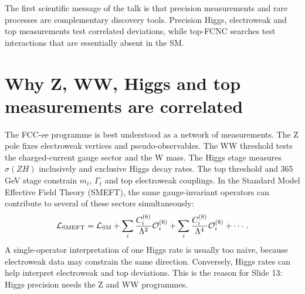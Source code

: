 \documentclass[11pt,a4paper]{report}
\begin{document}
\begin{keymessagebox}
The first scientific message of the talk is that precision measurements and rare processes are complementary discovery tools.  Precision Higgs, electroweak and top measurements test correlated deviations, while top-FCNC searches test interactions that are essentially absent in the SM.
\end{keymessagebox}

\section{Why Z, WW, Higgs and top measurements are correlated}
The FCC-ee programme is best understood as a network of measurements.  The Z pole fixes electroweak vertices and pseudo-observables.  The WW threshold tests the charged-current gauge sector and the W mass.  The Higgs stage measures $\sigma(ZH)$ inclusively and exclusive Higgs decay rates.  The top threshold and 365 GeV stage constrain $m_t$, $\Gamma_t$ and top electroweak couplings.  In the Standard Model Effective Field Theory (SMEFT), the same gauge-invariant operators can contribute to several of these sectors simultaneously:
\begin{equation}
  \mathcal L_{\rm SMEFT}=\mathcal L_{\rm SM}+
  \sum_i\frac{C_i^{(6)}}{\Lambda^2}\mathcal O_i^{(6)}+
  \sum_i\frac{C_i^{(8)}}{\Lambda^4}\mathcal O_i^{(8)}+\cdots .
\end{equation}
A single-operator interpretation of one Higgs rate is usually too naive, because electroweak data may constrain the same direction.  Conversely, Higgs rates can help interpret electroweak and top deviations.  This is the reason for Slide 13: Higgs precision needs the Z and WW programmes.
\end{document}
